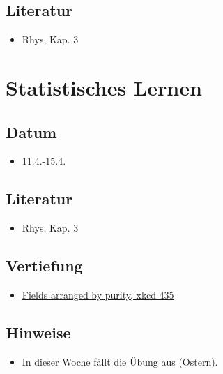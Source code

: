 \documentclass[
]{book}
\providecommand{\tightlist}{%
  \setlength{\itemsep}{0pt}\setlength{\parskip}{0pt}}
\begin{document}
\hypertarget{literatur-4}{%
\subsection{Literatur}\label{literatur-4}}

\begin{itemize}
\tightlist
\item
  Rhys, Kap. 3
\end{itemize}

\hypertarget{statistisches-lernen}{%
\section{Statistisches Lernen}\label{statistisches-lernen}}

\hypertarget{datum-4}{%
\subsection{Datum}\label{datum-4}}

\begin{itemize}
\tightlist
\item
  11.4.-15.4.
\end{itemize}

\hypertarget{literatur-5}{%
\subsection{Literatur}\label{literatur-5}}

\begin{itemize}
\tightlist
\item
  Rhys, Kap. 3
\end{itemize}

\hypertarget{vertiefung-1}{%
\subsection{Vertiefung}\label{vertiefung-1}}

\begin{itemize}
\tightlist
\item
  \href{https://xkcd.com/435/}{Fields arranged by purity, xkcd 435}
\end{itemize}

\hypertarget{hinweise-1}{%
\subsection{Hinweise}\label{hinweise-1}}

\begin{itemize}
\tightlist
\item
  In dieser Woche fällt die Übung aus (Ostern).
\end{itemize}
\end{document}
